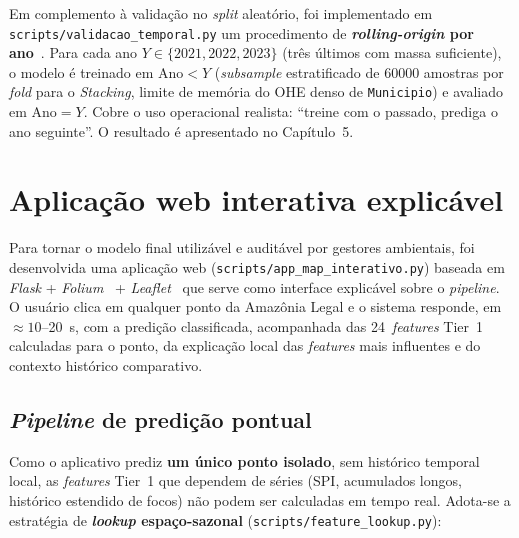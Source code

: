 Em complemento à validação no \emph{split} aleatório, foi implementado em \texttt{scripts/validacao\_temporal.py} um procedimento de \textbf{\emph{rolling-origin} por ano}~\cite{bergmeir2012cv}. Para cada ano \(Y \in \{2021, 2022, 2023\}\) (três últimos com massa suficiente), o modelo é treinado em \(\text{Ano} < Y\) (\emph{subsample} estratificado de \num{60000} amostras por \emph{fold} para o \emph{Stacking}, limite de memória do OHE denso de \texttt{Municipio}) e avaliado em \(\text{Ano} = Y\). Cobre o uso operacional realista: ``treine com o passado, prediga o ano seguinte''. O resultado é apresentado no Capítulo~5.


\section{Aplicação web interativa explicável}
\label{sec:metod_app_web}

Para tornar o modelo final utilizável e auditável por gestores ambientais, foi desenvolvida uma aplicação web (\texttt{scripts/app\_map\_interativo.py}) baseada em \emph{Flask} + \emph{Folium}~\cite{folium} + \emph{Leaflet}~\cite{leafletjs} que serve como interface explicável sobre o \emph{pipeline}. O usuário clica em qualquer ponto da Amazônia Legal e o sistema responde, em \(\approx 10\)--\SI{20}{\second}, com a predição classificada, acompanhada das 24~\emph{features} Tier~1 calculadas para o ponto, da explicação local das \emph{features} mais influentes e do contexto histórico comparativo.

\subsection{\emph{Pipeline} de predição pontual}

Como o aplicativo prediz \textbf{um único ponto isolado}, sem histórico temporal local, as \emph{features} Tier~1 que dependem de séries (SPI, acumulados longos, histórico estendido de focos) não podem ser calculadas em tempo real. Adota-se a estratégia de \textbf{\emph{lookup} espaço-sazonal} (\texttt{scripts/feature\_lookup.py}):

